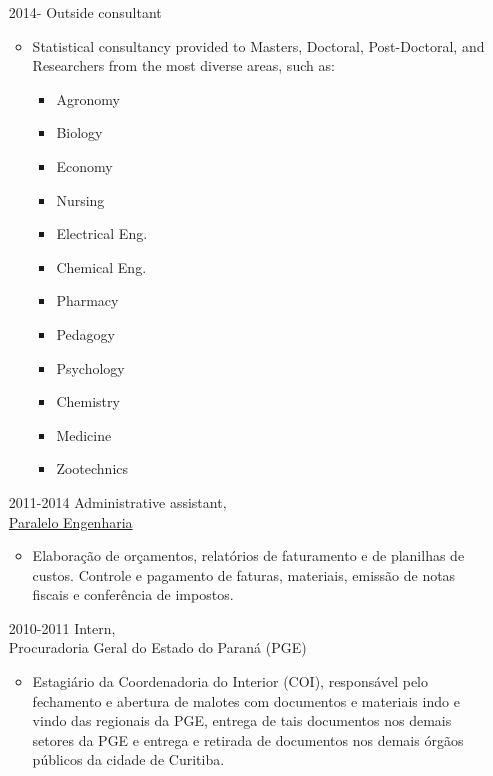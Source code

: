 \documentclass[12pt]{article}
\begin{document}
\begin{itemize}
 \item[2014-] Outside consultant
  \begin{itemize}
   \item Statistical consultancy provided to Masters, Doctoral,
         Post-Doctoral, and Researchers from the most diverse areas,
         such as:

    \begin{multicols}{4}
      \begin{itemize}
      \item Agronomy
      \item Biology
      \item Economy
      \item Nursing
      \item Electrical Eng.
      \item Chemical Eng.
      \item Pharmacy
      \item Pedagogy
      \item Psychology
      \item Chemistry
      \item Medicine
      \item Zootechnics
     \end{itemize}
    \end{multicols}
  \end{itemize}
\end{itemize}

\begin{itemize}
 \item[2011-2014] Administrative assistant,\\
                  \href{https://paralelo.eng.br/}{\color{blue}Paralelo Engenharia}
  \begin{itemize}
   \item Elabora\c{c}\~{a}o de or\c{c}amentos, relat\'{o}rios de
         faturamento e de planilhas de custos. Controle e pagamento de
         faturas, materiais, emiss\~{a}o de notas fiscais e
         confer\^{e}ncia de impostos.
  \end{itemize}

 \item[2010-2011] Intern,\\
                  Procuradoria Geral do Estado do Paran\'{a} (PGE)
  \begin{itemize}
   \item Estagi\'{a}rio da Coordenadoria do Interior (COI),
         respons\'{a}vel pelo fechamento e abertura de malotes com
         documentos e materiais indo e vindo das regionais da PGE,
         entrega de tais documentos nos demais setores da PGE e entrega
         e retirada de documentos nos demais \'{o}rg\~{a}os p\'{u}blicos
         da cidade de Curitiba.
  \end{itemize}
\end{itemize}
\end{document}

